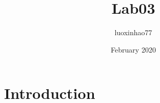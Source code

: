 \documentclass{article}
\title{Lab03}
\author{luoxinhao77 }
\date{February 2020}
\begin{document}
\maketitle

\section{Introduction}
\end{document}
